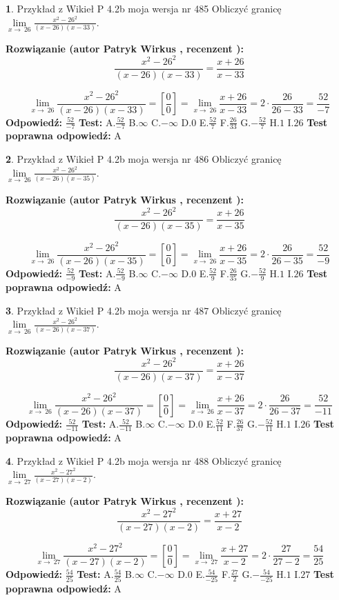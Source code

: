 \documentclass[12pt, a4paper]{article}
\theoremstyle{definition} %
\newtheorem{zad}{}
\newcommand{\zadStart}[1]{\begin{zad}#1\newline}
\newcommand{\zadStop}{\end{zad}}
\newcommand{\rozwStart}[2]{\noindent \textbf{Rozwiązanie (autor #1 , recenzent #2): }\newline}
\newcommand{\rozwStop}{\newline}
\newcommand{\odpStart}{\noindent \textbf{Odpowiedź:}\newline}
\newcommand{\odpStop}{\newline}
\newcommand{\testStart}{\noindent \textbf{Test:}\newline}
\newcommand{\testStop}{\newline}
\newcommand{\kluczStart}{\noindent \textbf{Test poprawna odpowiedź:}\newline}
\newcommand{\kluczStop}{\newline}
\begin{document}
\zadStart{Przykład z Wikieł P 4.2b moja wersja nr 485}
Obliczyć granicę $\lim\limits_{x\to\ 26}\frac{x^{2}-26^{2}}{(x-26)(x-33)}$.
\zadStop
\rozwStart{Patryk Wirkus}{}
$$\frac{x^{2}-26^{2}}{(x-26)(x-33)}=\frac{x+26}{x-33}$$

$$\lim\limits_{x\to\ 26}\frac{x^{2}-26^{2}}{(x-26)(x-33)}=[\frac{0}{0}]=\lim\limits_{x\to\ 26}\frac{x+26}{x-33}=2 \cdot \frac{26}{26-33} = \frac{52}{-7}$$
\rozwStop
\odpStart
$\frac{52}{-7}$
\odpStop
\testStart
A.$\frac{52}{-7}$
B.$\infty$
C.$-\infty$
D.$0$
E.$\frac{52}{7}$
F.$\frac{26}{33}$
G.$-\frac{52}{7}$
H.$1$
I.$26$
\testStop
\kluczStart
A
\kluczStop



\zadStart{Przykład z Wikieł P 4.2b moja wersja nr 486}
Obliczyć granicę $\lim\limits_{x\to\ 26}\frac{x^{2}-26^{2}}{(x-26)(x-35)}$.
\zadStop
\rozwStart{Patryk Wirkus}{}
$$\frac{x^{2}-26^{2}}{(x-26)(x-35)}=\frac{x+26}{x-35}$$

$$\lim\limits_{x\to\ 26}\frac{x^{2}-26^{2}}{(x-26)(x-35)}=[\frac{0}{0}]=\lim\limits_{x\to\ 26}\frac{x+26}{x-35}=2 \cdot \frac{26}{26-35} = \frac{52}{-9}$$
\rozwStop
\odpStart
$\frac{52}{-9}$
\odpStop
\testStart
A.$\frac{52}{-9}$
B.$\infty$
C.$-\infty$
D.$0$
E.$\frac{52}{9}$
F.$\frac{26}{35}$
G.$-\frac{52}{9}$
H.$1$
I.$26$
\testStop
\kluczStart
A
\kluczStop



\zadStart{Przykład z Wikieł P 4.2b moja wersja nr 487}
Obliczyć granicę $\lim\limits_{x\to\ 26}\frac{x^{2}-26^{2}}{(x-26)(x-37)}$.
\zadStop
\rozwStart{Patryk Wirkus}{}
$$\frac{x^{2}-26^{2}}{(x-26)(x-37)}=\frac{x+26}{x-37}$$

$$\lim\limits_{x\to\ 26}\frac{x^{2}-26^{2}}{(x-26)(x-37)}=[\frac{0}{0}]=\lim\limits_{x\to\ 26}\frac{x+26}{x-37}=2 \cdot \frac{26}{26-37} = \frac{52}{-11}$$
\rozwStop
\odpStart
$\frac{52}{-11}$
\odpStop
\testStart
A.$\frac{52}{-11}$
B.$\infty$
C.$-\infty$
D.$0$
E.$\frac{52}{11}$
F.$\frac{26}{37}$
G.$-\frac{52}{11}$
H.$1$
I.$26$
\testStop
\kluczStart
A
\kluczStop



\zadStart{Przykład z Wikieł P 4.2b moja wersja nr 488}
Obliczyć granicę $\lim\limits_{x\to\ 27}\frac{x^{2}-27^{2}}{(x-27)(x-2)}$.
\zadStop
\rozwStart{Patryk Wirkus}{}
$$\frac{x^{2}-27^{2}}{(x-27)(x-2)}=\frac{x+27}{x-2}$$

$$\lim\limits_{x\to\ 27}\frac{x^{2}-27^{2}}{(x-27)(x-2)}=[\frac{0}{0}]=\lim\limits_{x\to\ 27}\frac{x+27}{x-2}=2 \cdot \frac{27}{27-2} = \frac{54}{25}$$
\rozwStop
\odpStart
$\frac{54}{25}$
\odpStop
\testStart
A.$\frac{54}{25}$
B.$\infty$
C.$-\infty$
D.$0$
E.$\frac{54}{-25}$
F.$\frac{27}{2}$
G.$-\frac{54}{-25}$
H.$1$
I.$27$
\testStop
\kluczStart
A
\kluczStop
\end{document}
